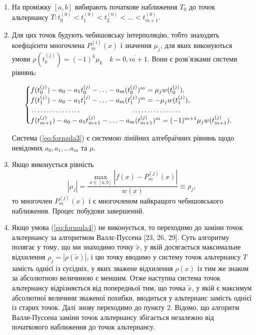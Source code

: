 \documentclass[ukrainian,14pt]{extarticle}
\begin{document}
\begin{enumerate}

\item
    На проміжку $[a, b]$ вибирають початкове наближення $T_0$ до точок альтернансу $T: t^{(0)}_{0} < t^{(0)}_{1} < t^{(0)}_{2} < \ldots < t^{(0)}_{m+1}.$
\item
    Для цих точок будують чебишовську інтерполяцію, тобто знаходять коефіцієнти многочлена $P^{(i)}_m(x)$ і значення $\mu_j$, для яких виконуються умови  $\rho(t^{(j)}_k) = (-1)^{k} \mu_k \quad k = \overline{0, m+1}$. Вони є розв'язками системи рівнянь:

\begin{equation}\label{eq:formula3}
\begin{cases}
f(t^{(j)}_0) - a_0 - a_1t^{(j)}_0 - \ldots - a_m(t_0^{(j)})^m=\mu_jw(t_0^{(j)}), \\
f(t^{(j)}_1)-a_0-a_1t^{(j)}_1 - \ldots - a_m(t^{(j)}_1)^m = - \mu_jw(t^{(j)}_1),\\
\dotfill\hfill\hbox{} \dotfill\hfill\hbox{}\\
f(t^{(j)}_{m+1}) -a_0 -a_1t^{(j)}_{m+1} - \ldots - a_m(t^{(j)}_{m+1})^m = (-1)^{m+1}\mu_jw(t^{(j)}_{m+1}).
\end{cases}
\end{equation}

Система (\ref{eq:formula3}) є системою   лінійних алгебраїчних рівнянь щодо невідомих $a_0, a_1, \ldots a_m$ та $\mu$.

\item
    Якщо виконується рівність
    \begin{equation}\label{eq:formula4}
        |\mu_j| = \frac{\max_{x \in [a,b]} |f(x) - P^{(j)}_m(x)|}{w(x)} \equiv \rho_j,
        \end{equation}
    то многочлен  $P^{(j)}_m(x)$ і є многочленом найкращого чебишовського наближення. Процес побудови завершений.
\item
    Якщо умова (\ref{eq:formula4}) не виконується, то переходимо до заміни точок альтернансу за алгоритмом Валлє-Пуссена [23, 26, 29]. Суть алгоритму полягає у тому, що ми знаходимо точку $\tilde{x}$, у якій досягається максимальне відхилення $\rho_j = |\rho(\tilde{x})|$, і цю точку вводимо у систему точок альтернансу $T$ замість однієї із сусідніх, у яких зважене відхилення $\rho(x)$ із тим же знаком за абсолютною величиною є меншим. Отже наступна система точок альтернансу відрізняється від попередньої тим, що точка $\tilde{x}$, у якій є максимум абсолютної величини зваженої похибки, вводиться у альтернанс замість однієї із старих точок. Далі знову переходимо до пункту 2. Відомо, що алгоритм Валле-Пуссена заміни точок альтернансу збігається незалежно від початкового наближення до точок альтернансу. 

\end{enumerate}
\end{document}
